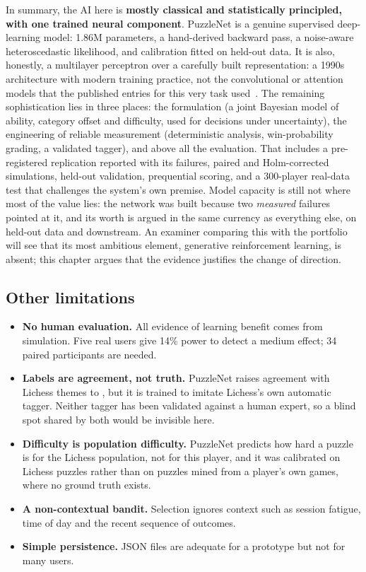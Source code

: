 In summary, the AI here is \textbf{mostly classical and statistically principled, with one trained
neural component}. PuzzleNet is a genuine supervised deep-learning model: 1.86M parameters, a
hand-derived backward pass, a noise-aware heteroscedastic likelihood, and calibration fitted on
held-out data. It is also, honestly, a multilayer perceptron over a carefully built representation:
a 1990s architecture with modern training practice, not the convolutional or attention models that
the published entries for this very task used~\cite{schutt2024estimating,milosz2024transformers}.
The remaining sophistication lies in three places: the formulation (a joint Bayesian model of ability,
category offset and difficulty, used for decisions under uncertainty), the engineering of reliable
measurement (deterministic analysis, win-probability grading, a validated tagger), and above all the
evaluation. That includes a pre-registered replication reported with its failures, paired and
Holm-corrected simulations, held-out validation, prequential scoring, and a 300-player real-data test
that challenges the system's own premise. Model capacity is still not where most of the value lies: the network was built
because two \emph{measured} failures pointed at it, and its worth is argued in the same currency as
everything else, on held-out data and downstream. An examiner comparing this with the portfolio will
see that its most ambitious element, generative reinforcement learning, is absent; this chapter argues
that the evidence justifies the change of direction.

\subsection{Other limitations}

\begin{itemize}
  \item \textbf{No human evaluation.} All evidence of learning benefit comes from simulation. Five real
        users give 14\% power to detect a medium effect; 34 paired participants are needed.
  \item \textbf{Labels are agreement, not truth.} PuzzleNet raises agreement with Lichess themes
        to \KAPPANN{}, but it is trained to imitate Lichess's own automatic tagger. Neither tagger has
        been validated against a human expert, so a blind spot shared by both would be invisible here.
  \item \textbf{Difficulty is population difficulty.} PuzzleNet predicts how hard a puzzle is for the
        Lichess population, not for this player, and it was calibrated on Lichess puzzles rather than
        on puzzles mined from a player's own games, where no ground truth exists.
  \item \textbf{A non-contextual bandit.} Selection ignores context such as session fatigue, time of day
        and the recent sequence of outcomes.
  \item \textbf{Simple persistence.} JSON files are adequate for a prototype but not for many users.
\end{itemize}

